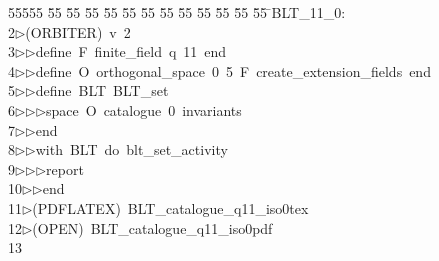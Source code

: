 %
%
\begin{tabbing}
55555 \= 55 \= 55 \= 55 \= 55 \= 55 \= 55 \= 55 \= 55 \= 55 \= 55 \= 55 \= 55 \= \>BLT\_11\_0:\\[0pt]
2\>$\triangleright$\>(ORBITER)\ v\ 2\ \\[0pt]
3\>$\triangleright$\>$\triangleright$\>define\ F\ finite\_field\ q\ 11\ end\ \\[0pt]
4\>$\triangleright$\>$\triangleright$\>define\ O\ orthogonal\_space\ 0\ 5\ F\ create\_extension\_fields\ end\ \\[0pt]
5\>$\triangleright$\>$\triangleright$\>define\ BLT\ BLT\_set\ \\[0pt]
6\>$\triangleright$\>$\triangleright$\>$\triangleright$\>space\ O\ catalogue\ 0\ invariants\ \\[0pt]
7\>$\triangleright$\>$\triangleright$\>end\ \\[0pt]
8\>$\triangleright$\>$\triangleright$\>with\ BLT\ do\ blt\_set\_activity\ \\[0pt]
9\>$\triangleright$\>$\triangleright$\>$\triangleright$\>report\ \\[0pt]
10\>$\triangleright$\>$\triangleright$\>end\\[0pt]
11\>$\triangleright$\>(PDFLATEX)\ BLT\_catalogue\_q11\_iso0tex\\[0pt]
12\>$\triangleright$\>(OPEN)\ BLT\_catalogue\_q11\_iso0pdf\\[0pt]
13\>\end{tabbing}

